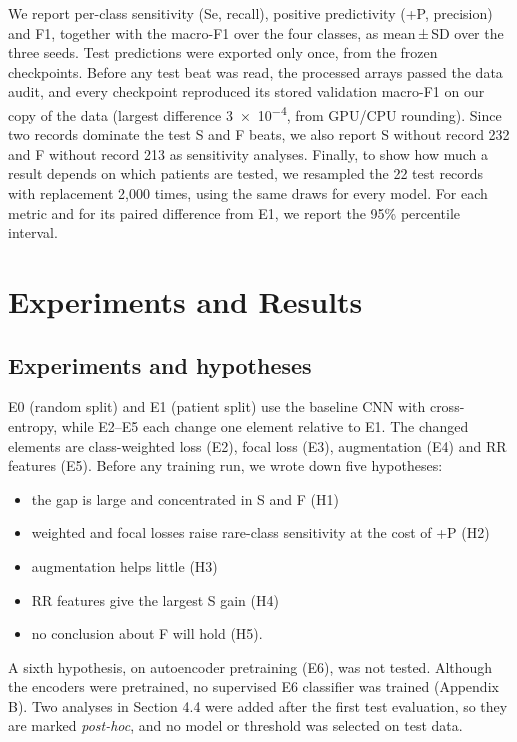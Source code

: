 \documentclass[10pt,a4paper]{article}
\begin{document}
We report per-class sensitivity (Se, recall), positive predictivity (+P, precision) and F1, together with the macro-F1 over the four classes, as mean\,±\,SD over the three seeds. Test predictions were exported only once, from the frozen checkpoints. Before any test beat was read, the processed arrays passed the data audit, and every checkpoint reproduced its stored validation macro-F1 on our copy of the data (largest difference 3~×~10\textsuperscript{−4}, from GPU/CPU rounding). Since two records dominate the test S and F beats, we also report S without record 232 and F without record 213 as sensitivity analyses. Finally, to show how much a result depends on which patients are tested, we resampled the 22 test records with replacement 2,000 times, using the same draws for every model. For each metric and for its paired difference from E1, we report the 95\% percentile interval.

\section{Experiments and Results}

\subsection{Experiments and hypotheses}

E0 (random split) and E1 (patient split) use the baseline CNN with cross-entropy, while E2–E5 each change one element relative to E1. The changed elements are class-weighted loss (E2), focal loss (E3), augmentation (E4) and RR features (E5). Before any training run, we wrote down five hypotheses:

{\begin{itemize}
\item the gap is large and concentrated in S and F (H1)
\item weighted and focal losses raise rare-class sensitivity at the cost of +P (H2)
\item augmentation helps little (H3)
\item RR features give the largest S gain (H4)
\item no conclusion about F will hold (H5).
\end{itemize}\par}

A sixth hypothesis, on autoencoder pretraining (E6), was not tested. Although the encoders were pretrained, no supervised E6 classifier was trained (Appendix B). Two analyses in Section 4.4 were added after the first test evaluation, so they are marked \emph{post-hoc}, and no model or threshold was selected on test data.
\end{document}

